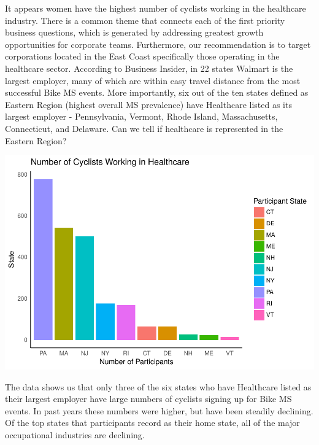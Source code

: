 \documentclass[]{article}
\begin{document}
It appears women have the highest number of cyclists working in the
healthcare industry. There is a common theme that connects each of the
first priority business questions, which is generated by addressing
greatest growth opportunities for corporate teams. Furthermore, our
recommendation is to target corporations located in the East Coast
specifically those operating in the healthcare sector. According to
Business Insider, in 22 states Walmart is the largest employer, many of
which are within easy travel distance from the most successful Bike MS
events. More importantly, six out of the ten states defined as Eastern
Region (highest overall MS prevalence) have Healthcare listed as its
largest employer - Pennsylvania, Vermont, Rhode Island, Massachusetts,
Connecticut, and Delaware. Can we tell if healthcare is represented in
the Eastern Region?

\includegraphics{index_files/figure-latex/east.health-1.pdf}

The data shows us that only three of the six states who have Healthcare
listed as their largest employer have large numbers of cyclists signing
up for Bike MS events. In past years these numbers were higher, but have
been steadily declining. Of the top states that participants record as
their home state, all of the major occupational industries are
declining.
\end{document}
